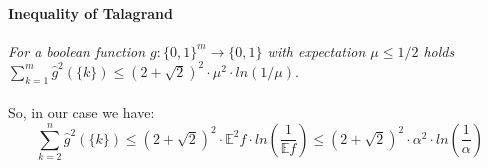 \documentclass{article}
\begin{document}
				\paragraph{Inequality of Talagrand}
					\textit{For a boolean function $g:\{0,1\}^m \rightarrow \{0,1\}$ with expectation $\mu \leq 1/2 $ holds $ \sum_{k=1}^m \hat{g}^2(\{k\}) \leq \left( 2 + \sqrt{2} \right)^2 \cdot \mu^2 \cdot ln(1/\mu).$ }
				
				\paragraph{}
				So, in our case we have: %
				\begin{equation}
					 \sum_{k=2}^n \hat{g}^2 \left( \{k\} \right) \leq \left( 2 + \sqrt{2} \right)^2 \cdot \mathbb{E}^2 f \cdot ln \left( \frac{1}{\mathbb{E} f} \right) \leq \left( 2 + \sqrt{2} \right)^2 \cdot \alpha^2 \cdot ln \left( \frac{1}{\alpha} \right)
				 \end{equation}
				 
				 
\end{document}
